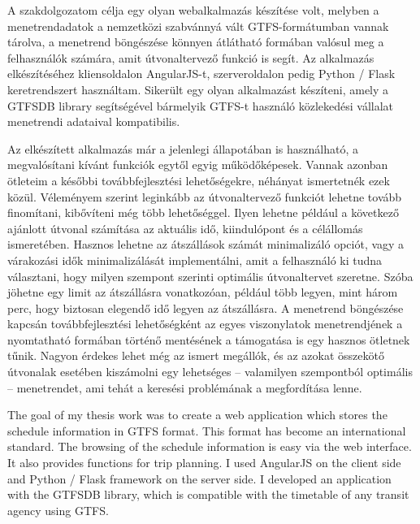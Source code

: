 

A szakdolgozatom célja egy olyan webalkalmazás készítése volt, melyben a menetrendadatok a nemzetközi szabvánnyá vált GTFS-formátumban vannak tárolva, a menetrend böngészése könnyen átlátható formában valósul meg a felhasználók számára, amit útvonaltervező funkció is segít. Az alkalmazás elkészítéséhez kliensoldalon AngularJS-t, szerveroldalon pedig Python / Flask keretrendszert használtam. Sikerült egy olyan alkalmazást készíteni, amely a GTFSDB library segítségével bármelyik GTFS-t használó közlekedési vállalat menetrendi adataival kompatibilis.

Az elkészített alkalmazás már a jelenlegi állapotában is használható, a megvalósítani kívánt funkciók egytől egyig működőképesek. Vannak azonban ötleteim a későbbi továbbfejlesztési lehetőségekre, néhányat ismertetnék ezek közül. Véleményem szerint leginkább az útvonaltervező funkciót lehetne tovább finomítani, kibővíteni még több lehetőséggel. Ilyen lehetne például a következő ajánlott útvonal számítása az aktuális idő, kiindulópont és a célállomás ismeretében. Hasznos lehetne az átszállások számát minimalizáló opciót, vagy a várakozási idők minimalizálását implementálni, amit a felhasználó ki tudna választani, hogy milyen szempont szerinti optimális útvonaltervet szeretne. Szóba jöhetne egy limit az átszállásra vonatkozóan, például több legyen, mint három perc, hogy biztosan elegendő idő legyen az átszállásra. A menetrend böngészése kapcsán továbbfejlesztési lehetőségként az egyes viszonylatok menetrendjének a nyomtatható formában történő mentésének a támogatása is egy hasznos ötletnek tűnik. Nagyon érdekes lehet még az ismert megállók, és az azokat összekötő útvonalak esetében kiszámolni egy lehetséges – valamilyen szempontból optimális – menetrendet, ami tehát a keresési problémának a megfordítása lenne.


The goal of my thesis work was to create a web application which stores the schedule information in GTFS format. This format has become an international standard. The browsing of the schedule information is easy via the web interface. It also provides functions for trip planning. I used AngularJS on the client side and Python / Flask framework on the server side. I developed an application with the GTFSDB library, which is compatible with the timetable of any transit agency using GTFS.

